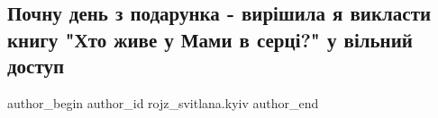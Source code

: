 
 
 
 
 

\subsection{Почну день з подарунка - вирішила я викласти книгу "Хто живе у Мами в серці?" у вільний доступ}
\label{sec:14_04_2022.fb.rojz_svitlana.kyiv.1.pochnu_den_z_podarun}

\ifcmt
 author_begin
   author_id rojz_svitlana.kyiv
 author_end
\fi
